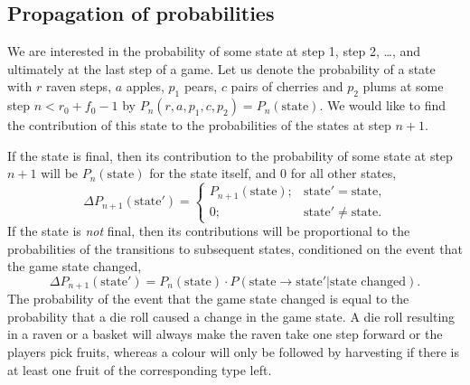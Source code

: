 \documentclass{article}
\begin{document}
\subsection{Propagation of probabilities}
We are interested in the probability of some state at step 1, step 2, \ldots, and ultimately at the last step of a game. Let us denote the probability of a state with \(r\) raven steps, \(a\) apples, \(p_1\) pears, \(c\) pairs of cherries and \(p_2\) plums at some step \(n < r_0 + f_0 - 1\) by \(P_n(r, a, p_1, c, p_2) = P_n(\text{state})\). We would like to find the contribution of this state to the probabilities of the states at step \(n + 1\).

If the state is final, then its contribution to the probability of some state at step \(n + 1\) will be \(P_n(\text{state})\) for the state itself, and 0 for all other states,
\[
    \Delta P_{n+1}(\text{state}') = 
\begin{cases}
    P_{n+1}(\text{state}); & \text{state}' = \text{state,} \\
    0; & \text{state}' \neq \text{state.}
\end{cases}
\]
If the state is \emph{not} final, then its contributions will be proportional to the probabilities of the transitions to subsequent states, conditioned on the event that the game state changed,
\[
  \Delta P_{n+1}(\text{state}') = P_n(\text{state}) \cdot P(\text{state} \to \text{state}' | \text{state changed}).
\]
The probability of the event that the game state changed is equal to the probability that a die roll caused a change in the game state. A die roll resulting in a raven or a basket will always make the raven take one step forward or the players pick fruits, whereas a colour will only be followed by harvesting if there is at least one fruit of the corresponding type left.
\end{document}
